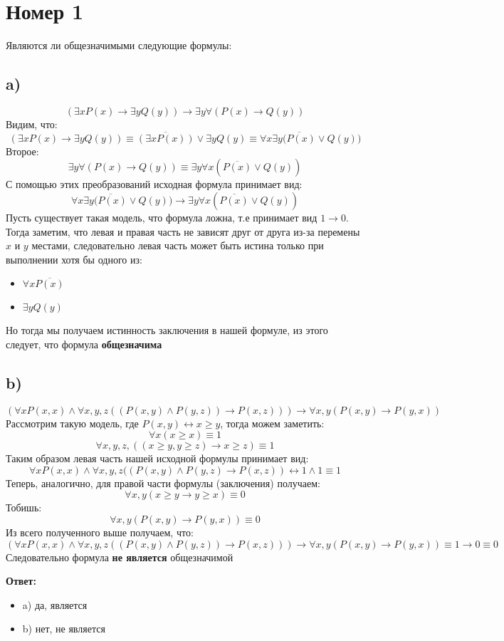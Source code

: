 \documentclass[a4paper,12pt]{article}
\author{Бурмашев Григорий, БПМИ-208}
\title{}
\date{\today}
\begin{document}
\maketitle
\clearpage
\section*{Номер 1}
Являются ли общезначимыми следующие формулы:
\subsection*{a)}
\[
(\exists x P(x) \rightarrow \exists y Q(y))
\rightarrow \exists y \forall (P(x) \rightarrow Q(y))
\]
Видим, что:
\[
(\exists x P(x) \rightarrow \exists y Q(y))
\equiv 
\overline{(\exists x P(x))} \vee \exists y Q(y) 
\equiv
\forall x \exists y \overline{(P(x)} \vee Q(y))
\]
Второе:
\[
\exists y \forall (P(x) \rightarrow Q(y))
\equiv
\exists y \forall x (\overline{P(x)} \vee Q(y))
\]
С помощью этих преобразований исходная формула принимает вид:
\[
\forall x \exists y \overline{(P(x)} \vee Q(y))
\rightarrow
\exists y \forall x (\overline{P(x)} \vee Q(y))
\]
Пусть существует такая модель, что формула ложна, т.е принимает вид $1 \rightarrow 0$. Тогда заметим, что левая и правая часть не зависят друг от друга из-за перемены $x$ и $y$ местами, следовательно левая часть может быть истина только при выполнении хотя бы одного из:
\begin{itemize}
\item $\forall x \overline{P(x)}$
\item $\exists y Q(y)$
\end{itemize}
Но тогда мы получаем истинность заключения в нашей формуле, из этого следует, что формула \textbf{общезначима}
\clearpage
\subsection*{b)}
\[
(\forall x P(x, x) \wedge \forall x, y, z ((P(x, y) \wedge P(y, z)) \rightarrow P(x, z))) \rightarrow \forall x, y (P(x, y) \rightarrow P(y, x))
\]
Рассмотрим такую модель, где $P(x, y)  \leftrightarrow x \ge y $, тогда можем заметить:
\[
\forall x (x \ge x) \equiv 1
\]
\[
\forall x, y, z, ((x \ge y, y \ge z ) \rightarrow x \ge z) \equiv 1
\]
Таким образом левая часть нашей исходной формулы принимает вид:
\[
\forall x P(x, x) \wedge \forall x, y, z  ((P(x, y) \wedge P(y, z) \rightarrow P(x, z)) \leftrightarrow 1 \wedge 1 \equiv 1
\]
Теперь, аналогично, для правой части формулы (заключения) получаем:
\[
\forall x, y (x \ge y \rightarrow y \ge x)
\equiv 0 
\]
Тобишь:
\[
\forall x, y (P(x, y) \rightarrow P(y, x))
\equiv 0 
\]
Из всего полученного выше получаем, что:
\[
(\forall x P(x, x) \wedge \forall x, y, z ((P(x, y) \wedge P(y, z)) \rightarrow P(x, z))) \rightarrow \forall x, y (P(x, y) \rightarrow P(y, x)) \equiv 1 \rightarrow 0 \equiv 0
\]
Следовательно формула \textbf{не является} общезначимой
\begin{center}
\textbf{Ответ: } 
\begin{itemize}
\item a) да, является
\item b) нет, не является
\end{itemize}
\end{center}
\end{document}
